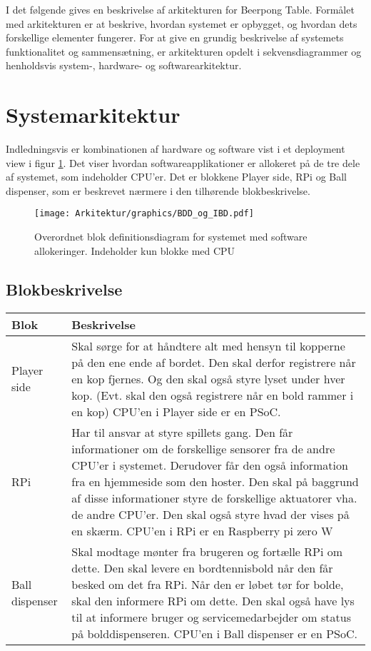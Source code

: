 \documentclass[Arkitektur/System_main.tex]{subfiles}
\begin{document}
I det følgende gives en beskrivelse af arkitekturen for Beerpong Table. Formålet med arkitekturen er at beskrive, hvordan systemet er opbygget, og hvordan dets forskellige elementer fungerer. For at give en grundig beskrivelse af systemets funktionalitet og sammensætning, er arkitekturen opdelt i sekvensdiagrammer og henholdsvis system-, hardware- og softwarearkitektur.

\section{Systemarkitektur} \label{sec:systemarkitektur}

 Indledningsvis er kombinationen af hardware og software vist i et deployment view i figur \ref{fig:systemarkitektur}. Det viser hvordan softwareapplikationer er allokeret på de tre dele af systemet, som indeholder CPU'er. Det er blokkene Player side, RPi og Ball dispenser, som er beskrevet nærmere i den tilhørende blokbeskrivelse.


\begin{figure}[H]
    \centering
    \texttt{[image: Arkitektur/graphics/BDD\_og\_IBD.pdf]}
    \caption{Overordnet blok definitionsdiagram for systemet med software allokeringer. Indeholder kun blokke med CPU}
    \label{fig:systemarkitektur}
\end{figure}

\subsection{Blokbeskrivelse}

\begin{table}[H]
\centering
\begin{tabular}{|L{0.2\columnwidth}|L{0.7\columnwidth}|}
\hline
\textbf{Blok} & \textbf{Beskrivelse} \\ \hline
Player side & Skal sørge for at håndtere alt med hensyn til kopperne på den ene ende af bordet. Den skal derfor registrere når en kop fjernes. Og den skal også styre lyset under hver kop. (Evt. skal den også registrere når en bold rammer i en kop) \newline CPU'en i Player side er en PSoC. \\ \hline
RPi & Har til ansvar at styre spillets gang. Den får informationer om de forskellige sensorer fra de andre CPU'er i systemet. Derudover får den også information fra en hjemmeside som den hoster. Den skal på baggrund af disse informationer styre de forskellige aktuatorer vha. de andre CPU'er. Den skal også styre hvad der vises på en skærm. \newline CPU'en i RPi er en Raspberry pi zero W  \\ \hline
Ball dispenser & Skal modtage mønter fra brugeren og fortælle RPi om dette. Den skal levere en bordtennisbold når den får besked om det fra RPi. Når den er løbet tør for bolde, skal den informere RPi om dette. Den skal også have lys til at informere bruger og servicemedarbejder om status på bolddispenseren. \newline CPU'en i Ball dispenser er en PSoC.  \\ \hline
\end{tabular}
\end{table}
\end{document}
